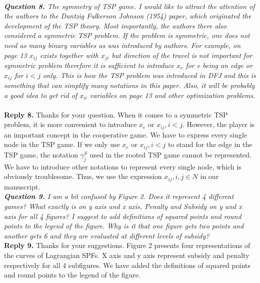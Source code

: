 \documentclass[11pt]{article}
\begin{document}
\\[4mm]
\noindent \textit{\textbf{Question 8.}
The symmetry of TSP game. I would like to attract the attention of the authors to the Dantzig Fulkerson Johnson (1954) paper, which originated the development of the TSP theory. Most importantly, the authors there also considered a symmetric TSP problem. If the problem is symmetric, one does not need as many binary variables as was introduced by authors. For example, on page 13 $x_{ij}$ exists together with $x_{ji}$ but direction of the travel is not important for symmetric problem therefore it is sufficient to introduce $x_e$ for e being an edge or $x_{ij}$ for $i < j$ only. This is how the TSP problem was introduced in DFJ and this is something that can simplify many notations in this paper. Also, it will be probably a good idea to get rid of $x_{ii}$ variables on page 13 and other optimization problems.}
~\\[2mm]
\noindent \textbf{Reply 8.}
Thanks for your question.
When it comes to a symmetric TSP problem, it is more convenient to introduce $x_e$ or $x_{ij}, i<j$.
However, the player is an important concept in the cooperative game.
We have to express every single node in the TSP game.
If we only use $x_e$ or $x_{ij}, i<j$ to stand for the edge in the TSP game, the notation $\gamma^{S}_j$ used in the rooted TSP game cannot be represented. We have to introduce other notations to represent every single node, which is obviously troublesome.
Thus, we use the expression $x_{ij}, i,j \in N$ in our manuscript.
\\[4mm]
\noindent \textit{\textbf{Question 9.}
I am a bit confused by Figure 2. Does it represent 4 different games? What exactly is on y axis and x axis, Penalty and Subsidy on y and x axis for all 4 figures? I suggest to add definitions of squared points and round points to the legend of the figure. Why is it that one figure gets two points and another gets 6 and they are evaluated at different levels of subsidy?}
~\\[2mm]
\noindent \textbf{Reply 9.}
Thanks for your suggestions. Figure 2 presents four representations of the curves of Lagrangian SPFs. X axis and y axis represent subsidy and penalty respectively for all 4 subfigures. We have added the definitions of squared points and round points to the legend of the figure.
\end{document}
